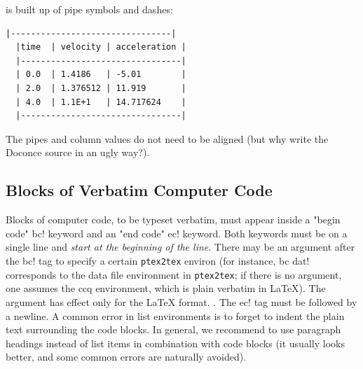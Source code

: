 \documentclass{article}
\begin{document}
\noindent
is built up of pipe symbols and dashes:
\begin{Verbatim}[fontsize=\fontsize{9pt}{9pt},tabsize=8,baselinestretch=0.85,
fontfamily=tt,xleftmargin=7mm]
  |--------------------------------|
  |time  | velocity | acceleration |
  |--------------------------------|
  | 0.0  | 1.4186   | -5.01        |
  | 2.0  | 1.376512 | 11.919       |
  | 4.0  | 1.1E+1   | 14.717624    |
  |--------------------------------|
\end{Verbatim}
\noindent
The pipes and column values do not need to be aligned (but why write
the Doconce source in an ugly way?).

\subsection{Blocks of Verbatim Computer Code}

\label{sec:verbatim:blocks}

Blocks of computer code, to be typeset verbatim, must appear inside a
"begin code" {\fontsize{10pt}{10pt}\verb!!bc!} keyword and an "end code" {\fontsize{10pt}{10pt}\verb!!ec!} keyword. Both
keywords must be on a single line and \emph{start at the beginning of the
line}.  There may be an argument after the {\fontsize{10pt}{10pt}\verb!!bc!} tag to specify a
certain {\fontsize{10pt}{10pt}\verb!ptex2tex!} environ (for instance, {\fontsize{10pt}{10pt}\verb!!bc dat!} corresponds to the
data file environment in {\fontsize{10pt}{10pt}\verb!ptex2tex!}; if there is no argument, one
assumes the ccq environment, which is plain verbatim in {\LaTeX}).  The
argument has effect only for the {\LaTeX} format.  .  The {\fontsize{10pt}{10pt}\verb!!ec!} tag must
be followed by a newline.  A common error in list environments is to
forget to indent the plain text surrounding the code blocks. In
general, we recommend to use paragraph headings instead of list items
in combination with code blocks (it usually looks better, and some
common errors are naturally avoided).
\end{document}

